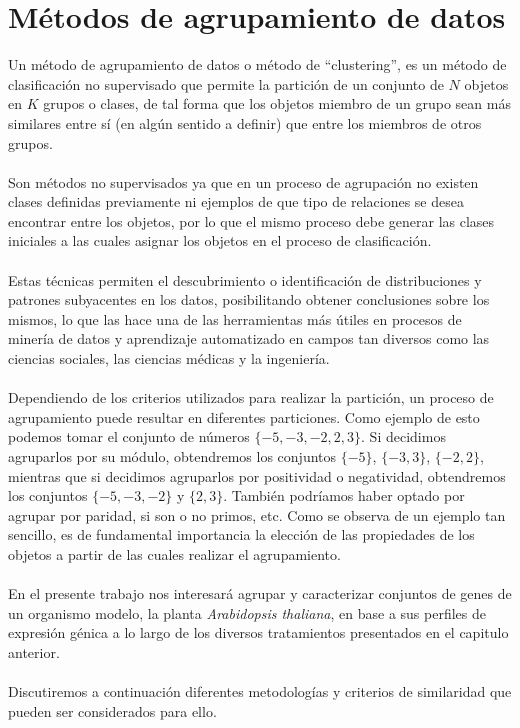 \chapter{Métodos de agrupamiento de datos}
Un método de agrupamiento de datos o método de ``clustering'', es un método de clasificación no supervisado que permite la partición de un conjunto de $N$ objetos en $K$ grupos o clases, de tal forma que los objetos miembro de un grupo sean más similares entre sí (en algún sentido a definir) que entre los miembros de otros grupos.\\\\
Son métodos no supervisados ya que en un proceso de agrupación no existen clases definidas previamente ni ejemplos de que tipo de relaciones se desea encontrar entre los objetos, por lo que el mismo proceso debe generar las clases iniciales a las cuales asignar los objetos en el proceso de clasificación.\\\\
Estas técnicas permiten el descubrimiento o identificación de distribuciones y patrones subyacentes en los datos, posibilitando obtener conclusiones sobre los mismos, lo que las hace una de las herramientas más útiles en procesos de minería de datos y aprendizaje automatizado en campos tan diversos como las ciencias sociales, las ciencias médicas y la ingeniería.\\\\
Dependiendo de los criterios utilizados para realizar la partición, un proceso de agrupamiento puede resultar en diferentes particiones. Como ejemplo de esto podemos tomar el conjunto de números $\{-5, -3, -2, 2, 3\}$. Si decidimos agruparlos por su módulo, obtendremos los conjuntos $\{-5\}$, $\{-3, 3\}$, $\{-2, 2\}$, mientras que si decidimos agruparlos por positividad o negatividad, obtendremos los conjuntos $\{-5, -3, -2\}$ y $\{2, 3\}$. También podríamos haber optado por agrupar por paridad, si son o no primos, etc. Como se observa de un ejemplo tan sencillo, es de fundamental importancia la elección de las propiedades de los objetos a partir de las cuales realizar el agrupamiento.\\\\
En el presente trabajo nos interesará agrupar y caracterizar conjuntos de genes de un organismo modelo, la planta \textit{Arabidopsis thaliana}, en base a sus perfiles de expresión génica a lo largo de los diversos tratamientos presentados en el capitulo anterior.\cite{Gan2007, Halkidi2001, Domany1999}\\\\
Discutiremos a continuación diferentes metodologías y criterios de similaridad que pueden ser considerados para ello.
